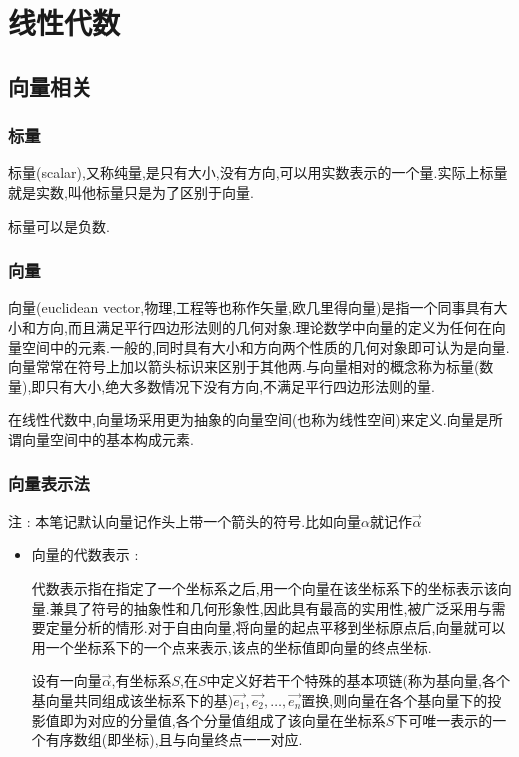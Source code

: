 \chapter{线性代数}{

  \section{向量相关}{

      \subsection{标量}{
          标量(scalar),又称纯量,是只有大小,没有方向,可以用实数表示的一个量.实际上标量就是实数,叫他标量只是为了区别于向量.

          标量可以是负数.
      }%

      \subsection{向量}{
          向量(euclidean vector,物理,工程等也称作矢量,欧几里得向量)是指一个同事具有大小和方向,而且满足平行四边形法则的几何对象.理论数学中向量的定义为任何在向量空间中的元素.一般的,同时具有大小和方向两个性质的几何对象即可认为是向量.向量常常在符号上加以箭头标识来区别于其他两.与向量相对的概念称为标量(数量),即只有大小,绝大多数情况下没有方向,不满足平行四边形法则的量.

          在线性代数中,向量场采用更为抽象的向量空间(也称为线性空间)来定义.向量是所谓向量空间中的基本构成元素.
      }%

      \subsection{向量表示法}{
          注 : 本笔记默认向量记作头上带一个箭头的符号.比如向量$\alpha$就记作$\vec{\alpha}$

          \begin{itemize}
              \item {
                    向量的代数表示 :

                    代数表示指在指定了一个坐标系之后,用一个向量在该坐标系下的坐标表示该向量.兼具了符号的抽象性和几何形象性,因此具有最高的实用性,被广泛采用与需要定量分析的情形.对于自由向量,将向量的起点平移到坐标原点后,向量就可以用一个坐标系下的一个点来表示,该点的坐标值即向量的终点坐标.

                    设有一向量$\vec{\alpha}$,有坐标系$S$,在$S$中定义好若干个特殊的基本项链(称为基向量,各个基向量共同组成该坐标系下的基)$\vec{e_1},\vec{e_2},\dots,\vec{e_n}$置换,则向量在各个基向量下的投影值即为对应的分量值,各个分量值组成了该向量在坐标系$S$下可唯一表示的一个有序数组(即坐标),且与向量终点一一对应.

}
\end{itemize}}}}
